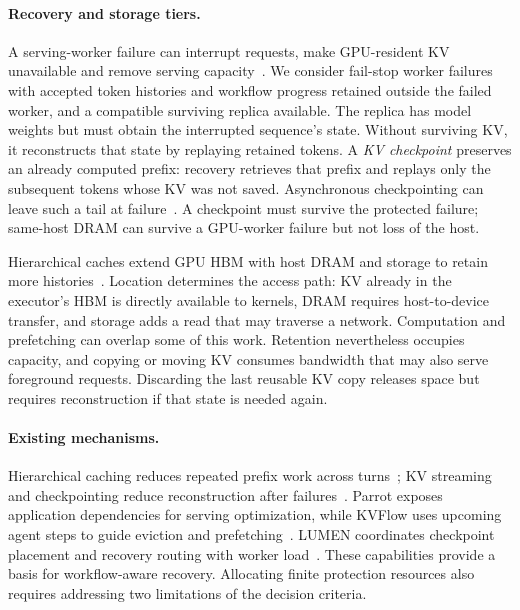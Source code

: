 \paragraph{Recovery and storage tiers.}
A serving-worker failure can interrupt requests, make GPU-resident KV
unavailable and remove serving capacity~\cite{cao2026lumen}. We consider
fail-stop worker failures with accepted token histories and workflow
progress retained outside the failed worker, and a compatible surviving
replica available. The replica has model weights but must obtain the
interrupted sequence's state. Without surviving KV, it reconstructs that
state by replaying retained tokens. A \emph{KV checkpoint} preserves an
already computed prefix: recovery retrieves that prefix and replays only
the subsequent tokens whose KV was not saved. Asynchronous checkpointing
can leave such a tail at failure~\cite{strati2024dejavu,jayakody2026ghostserve}.
A checkpoint must survive the protected failure; same-host DRAM can
survive a GPU-worker failure but not loss of the host.

Hierarchical caches extend GPU HBM with host DRAM and storage to retain
more histories~\cite{gao2024cachedattention,qin2025mooncake}.
Location determines the access path: KV already in the executor's HBM
is directly available to kernels, DRAM requires host-to-device transfer,
and storage adds a read that may traverse a network. Computation and
prefetching can overlap some of this work. Retention nevertheless occupies
capacity, and copying or moving KV consumes bandwidth that may also serve
foreground requests. Discarding the last reusable KV copy releases space
but requires reconstruction if that state is needed again.

\paragraph{Existing mechanisms.}
Hierarchical caching reduces repeated prefix work across
turns~\cite{gao2024cachedattention,qin2025mooncake}; KV streaming and
checkpointing reduce reconstruction after
failures~\cite{strati2024dejavu,jayakody2026ghostserve}.
Parrot exposes application dependencies for serving optimization, while
KVFlow uses upcoming agent steps to guide eviction and
prefetching~\cite{lin2024parrot,pan2025kvflow}. LUMEN coordinates
checkpoint placement and recovery routing with worker
load~\cite{cao2026lumen}. These capabilities provide a basis for
workflow-aware recovery. Allocating finite protection resources also
requires addressing two limitations of the decision criteria.

